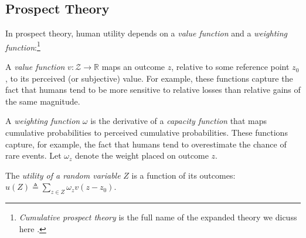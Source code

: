 \subsection{Prospect Theory}

In prospect theory, human utility depends on a \textit{value function} and a \textit{weighting function}:\footnote{\textit{Cumulative prospect theory} is the full name of the expanded theory we dicuss here \citep{tversky1992advances}.}

\begin{definition}
A \textit{value function} $v: \mathcal{Z} \to \mathbb{R}$ maps an outcome $z$, relative to some reference point $z_0$, to its perceived (or subjective) value.
For example, these functions capture the fact that humans tend to be more sensitive to relative losses than relative gains of the same magnitude.
\end{definition}

\begin{definition}
A \textit{weighting function} $\omega$ is the derivative of a \textit{capacity function} that maps cumulative probabilities to perceived cumulative probabilities.
These functions capture, for example, the fact that humans tend to overestimate the chance of rare events.
Let $\omega_z$ denote the weight placed on outcome $z$.
\end{definition}

\begin{definition}
The \textit{utility of a random variable} $Z$ is a function of its outcomes: $u(Z) \triangleq \sum_{z \in Z} \omega_z v(z - z_0)$.
\end{definition}

